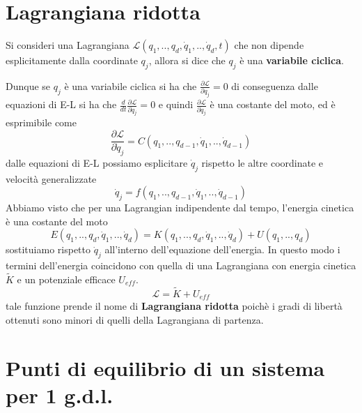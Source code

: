\section{Lagrangiana ridotta}

\begin{definition}
	Si consideri una Lagrangiana $\mathcal{L}(q_1,..,q_d,\dot{q}_1,..,\dot{q}_d,t)$ che non dipende esplicitamente dalla coordinate $q_j$, allora si dice che $q_j$ \`{e} una \textbf{variabile ciclica}.
\end{definition}
\noindent Dunque se $q_j$ \`{e} una variabile ciclica si ha che $\frac{\partial \mathcal{L}}{\partial q_j} = 0$ di conseguenza dalle equazioni di E-L si ha che $\frac{d}{dt} \frac{\partial \mathcal{L}}{\partial \dot{q}_j} = 0$ e quindi $\frac{\partial \mathcal{L}}{\partial \dot{q}_j}$ \`{e} una costante del moto, ed \`{e} esprimibile come
\begin{equation}
	\frac{\partial \mathcal{L}}{\partial \dot{q}_j} = C(q_1,..,q_{d-1},\dot{q}_1,..,\dot{q}_{d-1})
\end{equation}
dalle equazioni di E-L possiamo esplicitare $\dot{q}_j$ rispetto le altre coordinate e velocit\`{a} generalizzate 
\begin{equation}
	\dot{q}_j = f(q_1,..,q_{d-1},\dot{q}_1,..,\dot{q}_{d-1})
\end{equation}
Abbiamo visto che per una Lagrangian indipendente dal tempo, l'energia cinetica \`{e} una costante del moto
\begin{equation}
	E(q_1,..,q_d,\dot{q}_1,..,\dot{q}_d) = K(q_1,..,q_d,\dot{q}_1,..,\dot{q}_d) + U(q_1,..,q_d)
\end{equation}
sostituiamo rispetto $\dot{q}_j$ all'interno dell'equazione dell'energia. In questo modo i termini dell'energia coincidono con quella di una Lagrangiana con energia cinetica $\tilde{K}$ e un potenziale efficace $U_{eff}$.
\begin{equation}
	\mathcal{L} = \tilde{K} + U_{eff}
\end{equation}
tale funzione prende il nome di \textbf{Lagrangiana ridotta} poich\`{e} i gradi di libert\`{a} ottenuti sono minori di quelli della Lagrangiana di partenza.

\section{Punti di equilibrio di un sistema per 1 g.d.l.}

